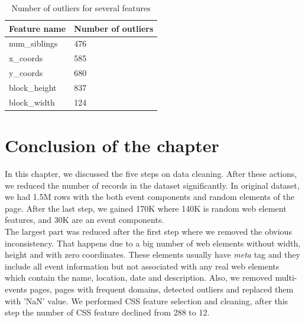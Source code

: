 \begin{table}[h]
\begin{center}
{\renewcommand{\arraystretch}{1.5}
\begin{tabular}{| p{5cm} | p{5cm}|}
\hline
\textbf{Feature name}    & \textbf{Number of outliers}\\
\hline
num\_siblings    & 476\\
\hline
x\_coords    & 585\\
\hline
y\_coords    & 680\\
\hline
block\_height    & 837\\
\hline
block\_width    & 124\\
\hline
\end{tabular}}
\caption{Number of outliers for several features}
\label{table:outlier}
\end{center}
\end{table}



\section*{Conclusion of the chapter}
In this chapter, we discussed the five steps on data cleaning. After these actions, we reduced the number of records in the dataset significantly. In original dataset, we had 1.5M rows with the both event components and random elements of the page. After the last step, we gained 170K where 140K is random web element features, and 30K are an event components.\\

The largest part was reduced after the first step where we removed the obvious inconsistency. That happens due to a big number of web elements without width, height and with zero coordinates. These elements usually have \textit{meta} tag and they include all event information but not associated with any real web elements which contain the name, location, date and description. Also, we removed multi-events pages, pages with frequent domains, detected outliers and replaced them with 'NaN' value. We performed CSS feature selection and cleaning, after this step the number of CSS feature declined from 288 to 12.